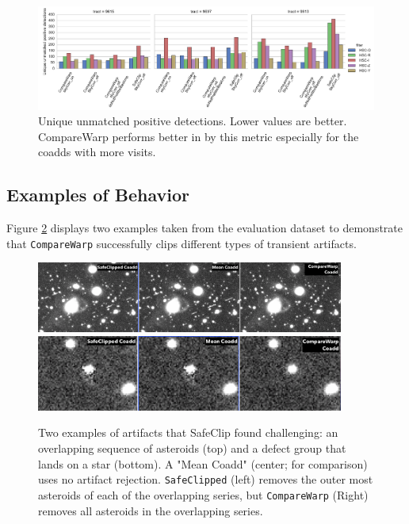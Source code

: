 \documentclass[DM,authoryear,toc]{lsstdoc}
\begin{document}
\begin{figure}
\begin{centering}
\includegraphics[width=1.0\textwidth]{figures/missed_uniquePosDet.pdf}
\par\end{centering}
\caption{\label{fig:uniquePosDet} Unique unmatched positive detections. Lower values are better. CompareWarp performs better in by this metric especially for the coadds with more visits.}
\end{figure}

\subsection{Examples of Behavior}
Figure \ref{fig:old_examples} displays two examples taken from the evaluation dataset to demonstrate that \texttt{CompareWarp} successfully clips different types of transient artifacts.

\begin{figure}
\begin{centering}
\includegraphics[width=0.9\textwidth]{figures/prototypeRobustAsteroids.png}
\includegraphics[width=0.9\textwidth]{figures/PrototypeRobustDetect1.png}
\par\end{centering}
\caption{\label{fig:old_examples} Two examples of artifacts that SafeClip found challenging: an overlapping sequence of asteroids (top) and a defect group that lands on a star (bottom).  A "Mean Coadd" (center; for comparison) uses no artifact rejection.  \texttt{SafeClipped} (left) removes the outer most asteroids of each of the overlapping series, but  \texttt{CompareWarp} (Right)  removes all asteroids in the overlapping series.}
\end{figure}
\end{document}
